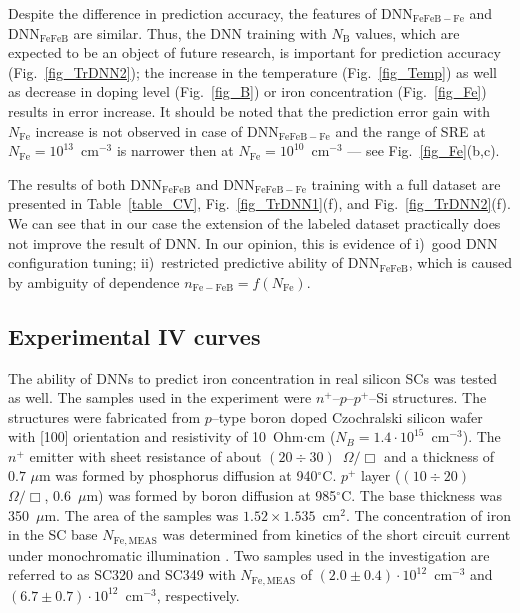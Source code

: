 \documentclass[num-refs]{wiley-article} %
\begin{document}
Despite the difference in prediction accuracy,
the  features of DNN$_\mathrm{FeFeB-Fe}$ and DNN$_\mathrm{FeFeB}$ are similar.
Thus,
the DNN training with $N_\mathrm{B}$ values, which are expected to be an object of future research,
is important for prediction accuracy (Fig.~\ref{fig_TrDNN2});
the increase in the temperature (Fig.~\ref{fig_Temp}) as well as decrease
in doping level (Fig.~\ref{fig_B}) or iron concentration (Fig.~\ref{fig_Fe})
results in error increase.
It should be noted that the prediction error gain with $N_\mathrm{Fe}$ increase is not observed in case of DNN$_\mathrm{FeFeB-Fe}$ and
the range of SRE at $N_\mathrm{Fe}=10^{13}$~cm$^{-3}$ is narrower then at $N_\mathrm{Fe}=10^{10}$~cm$^{-3}$ --- see Fig.~\ref{fig_Fe}(b,c).


The results of both DNN$_\mathrm{FeFeB}$ and DNN$_\mathrm{FeFeB-Fe}$
training with a full dataset are presented in Table~\ref{table_CV}, Fig.~\ref{fig_TrDNN1}(f), and Fig.~\ref{fig_TrDNN2}(f).
We can see that in our case the extension of the labeled dataset practically does not improve the result of DNN.
In our opinion, this is evidence of
i)~good DNN configuration tuning;
ii)~restricted predictive ability of DNN$_\mathrm{FeFeB}$,
which is caused by ambiguity of dependence $n_\mathrm{Fe-FeB}=f(N_\mathrm{Fe})$.


\subsection{Experimental IV curves}


The ability of DNNs to predict iron concentration in real silicon SCs was tested as well.
The samples used in the experiment were $n^+$--$p$--$p^+$--Si structures.
The structures were fabricated from $p$--type boron doped Czochralski silicon wafer with [100]
orientation and resistivity of 10~Ohm$\cdot$cm ($N_B = 1.4\cdot10^{15}$~cm$^{-3}$).
The $n^+$ emitter with sheet resistance of about $(20\div30)$~$\Omega/\Box$ and a thickness
of $0.7$ $\mu$m was formed by phosphorus diffusion at 940$^\circ$C.
$p^+$ layer ($(10\div20)$~$\Omega/\Box$, $0.6$~$\mu$m)
was formed by boron diffusion at 985$^\circ$C.
The base thickness was 350~$\mu$m.
The area of the samples was $1.52\times1.535$~cm$^2$.
The concentration of iron in the SC base $N_\mathrm{Fe,MEAS}$
was determined from kinetics of the short circuit current under monochromatic illumination \cite{2021CMLTP}.
Two samples used in the investigation are referred to as SC320 and SC349 with $N_\mathrm{Fe,MEAS}$
of $(2.0\pm0.4)\cdot10^{12}$~cm$^{-3}$ and $(6.7\pm0.7)\cdot10^{12}$~cm$^{-3}$,
respectively.
\end{document}
